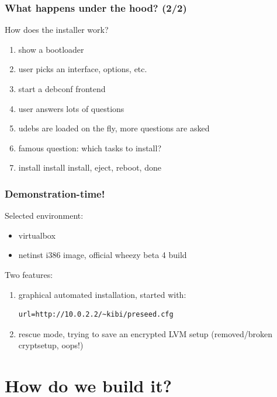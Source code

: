 \documentclass[handout]{beamer}
\begin{document}
\begin{frame}[fragile]
  \frametitle{What happens under the hood? (2/2)}

  How does the installer work?
  \begin{enumerate}
  \pause
  \item show a bootloader
  \pause
  \item user picks an interface, options, etc.
  \pause
  \item start a debconf frontend
  \pause
  \item user answers lots of questions
  \pause
  \item udebs are loaded on the fly, more questions are asked
  \pause
  \item famous question: which tasks to install?
  \pause
  \item install install install, eject, reboot, done
  \end{enumerate}
\end{frame}

\begin{frame}[fragile]
  \frametitle{Demonstration-time!}

  Selected environment:
  \begin{itemize}
  \item virtualbox
  \item netinst i386 image, official wheezy beta 4 build
  \end{itemize}

  \vspace{1em}
  \pause

  Two features:
  \begin{enumerate}
  \item graphical automated installation, started with:
\begin{lstlisting}
url=http://10.0.2.2/~kibi/preseed.cfg
\end{lstlisting}
  \pause
  \item rescue mode, trying to save an encrypted LVM setup (removed/broken cryptsetup, oops!)
  \end{enumerate}
\end{frame}


\section{How do we build it?}
\end{document}

